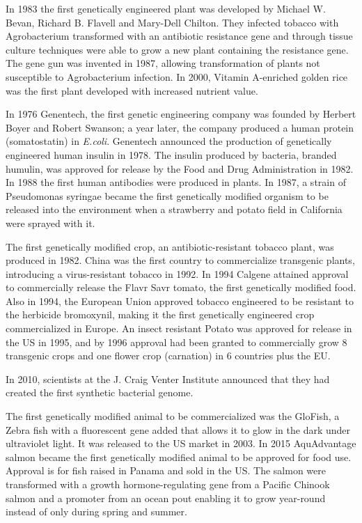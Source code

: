 In 1983 the first genetically engineered plant was developed by Michael W. Bevan, Richard B. Flavell and Mary-Dell Chilton. They infected tobacco with Agrobacterium transformed with an antibiotic resistance gene and through tissue culture techniques were able to grow a new plant containing the resistance gene. The gene gun was invented in 1987, allowing transformation of plants not susceptible to Agrobacterium infection. In 2000, Vitamin A-enriched golden rice was the first plant developed with increased nutrient value.

In 1976 Genentech, the first genetic engineering company was founded by Herbert Boyer and Robert Swanson; a year later, the company produced a human protein (somatostatin) in \emph{E.coli}. Genentech announced the production of genetically engineered human insulin in 1978. The insulin produced by bacteria, branded humulin, was approved for release by the Food and Drug Administration in 1982. In 1988 the first human antibodies were produced in plants. In 1987, a strain of Pseudomonas syringae became the first genetically modified organism to be released into the environment when a strawberry and potato field in California were sprayed with it.

The first genetically modified crop, an antibiotic-resistant tobacco plant, was produced in 1982. China was the first country to commercialize transgenic plants, introducing a virus-resistant tobacco in 1992. In 1994 Calgene attained approval to commercially release the Flavr Savr tomato, the first genetically modified food. Also in 1994, the European Union approved tobacco engineered to be resistant to the herbicide bromoxynil, making it the first genetically engineered crop commercialized in Europe. An insect resistant Potato was approved for release in the US in 1995, and by 1996 approval had been granted to commercially grow 8 transgenic crops and one flower crop (carnation) in 6 countries plus the EU.

In 2010, scientists at the J. Craig Venter Institute announced that they had created the first synthetic bacterial genome.

The first genetically modified animal to be commercialized was the GloFish, a Zebra fish with a fluorescent gene added that allows it to glow in the dark under ultraviolet light. It was released to the US market in 2003. In 2015 AquAdvantage salmon became the first genetically modified animal to be approved for food use. Approval is for fish raised in Panama and sold in the US. The salmon were transformed with a growth hormone-regulating gene from a Pacific Chinook salmon and a promoter from an ocean pout enabling it to grow year-round instead of only during spring and summer.

